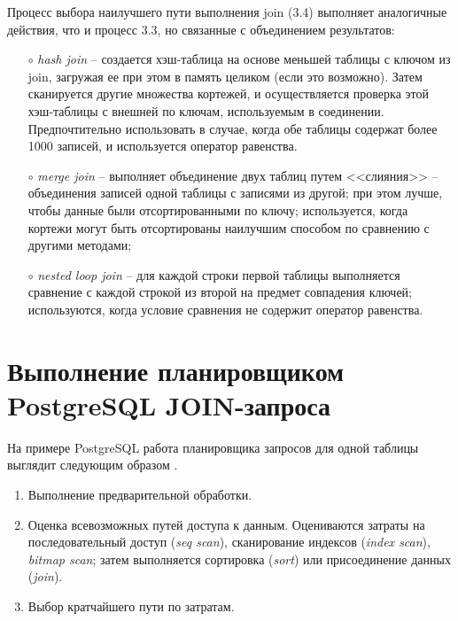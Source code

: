 Процесс выбора наилучшего пути выполнения join (3.4) выполняет аналогичные действия, что и процесс 3.3, но связанные с объединением результатов:
\begin{itemize}
	\item[$\circ$] \textit{hash join} -- создается хэш-таблица на основе меньшей таблицы с ключом из join, загружая ее при этом в память целиком (если это возможно). Затем сканируется другие множества кортежей, и осуществляется проверка этой хэш-таблицы с внешней по ключам, используемым в соединении. Предпочтительно использовать в случае, когда обе таблицы содержат более 1000 записей, и используется оператор равенства.
	\vspace{-0.2cm}
	\item[$\circ$] \textit{merge join} -- выполняет объединение двух таблиц путем <<слияния>> -- объединения записей одной таблицы с записями из другой; при этом лучше, чтобы данные были отсортированными по ключу; используется, когда кортежи могут быть отсортированы наилучшим способом по сравнению с другими методами;  
	\vspace{-0.2cm}
	\item[$\circ$] \textit{nested loop join} -- для каждой строки первой таблицы выполняется сравнение с каждой строкой из второй на предмет совпадения ключей; используются, когда условие сравнения не содержит оператор равенства.
\end{itemize}

\section{Выполнение планировщиком PostgreSQL \newline JOIN-запроса}
\vspace{-0.5cm}
На примере PostgreSQL работа планировщика запросов для одной таблицы выглядит следующим образом \cite{plan_query_postgres}.
\begin{enumerate}
	\item Выполнение предварительной обработки. 
	\vspace{-0.2cm}
	\item Оценка всевозможных путей доступа к данным. Оцениваются затраты на последовательный доступ (\textit{seq scan}), сканирование индексов (\textit{index scan}), \textit{bitmap scan}; затем выполняется сортировка (\textit{sort}) или присоединение данных (\textit{join}).
	\vspace{-0.2cm}
	\item Выбор кратчайшего пути по затратам.
\end{enumerate}

